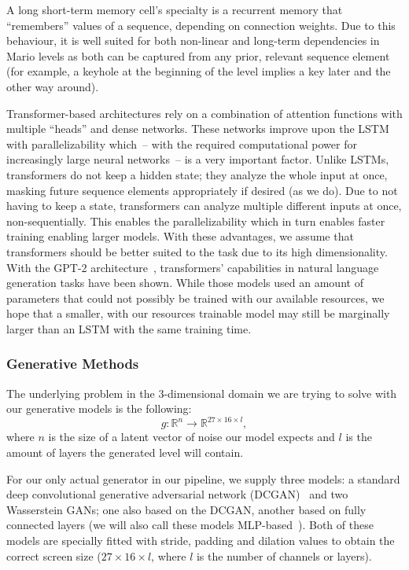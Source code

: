A long short-term memory cell's specialty is a recurrent memory that
``remembers'' values of a sequence, depending on connection weights.
Due to this behaviour, it is well suited for both non-linear and
long-term dependencies in Mario levels as both can be captured from
any prior, relevant sequence element (for example, a keyhole at the
beginning of the level implies a key later and the other way around).

Transformer-based architectures rely on a combination of attention
functions with multiple ``heads'' and dense networks. These networks
improve upon the LSTM with parallelizability which~-- with the required
computational power for increasingly large neural networks~-- is a very
important factor. Unlike LSTMs, transformers do not keep a hidden
state; they analyze the whole input at once, masking future sequence
elements appropriately if desired (as we do). Due to not having to
keep a state, transformers can analyze multiple different inputs at
once, non-sequentially. This enables the parallelizability which in
turn enables faster training enabling larger models. With these
advantages, we assume that transformers should be better suited to the
task due to its high dimensionality. With the GPT-2
architecture~\cite{radfordLanguageModelsAre}, transformers'
capabilities in natural language generation tasks have been shown.
While those models used an amount of parameters that could not
possibly be trained with our available resources, we hope that a
smaller, with our resources trainable model may still be marginally
larger than an LSTM with the same training time.

\subsubsection{Generative Methods}

The underlying problem in the 3-dimensional domain we are trying to
solve with our generative models is the following:
\begin{equation*}
  g: \mathbb{R}^{n} \to \mathbb{R}^{27 \times 16 \times l},
\end{equation*}
where $n$ is the size of a latent vector of noise our model expects
and $l$ is the amount of layers the generated level will contain.

For our only actual generator in our pipeline, we supply three models:
a standard deep convolutional generative adversarial network
(DCGAN)~\cite{radfordUnsupervisedRepresentationLearning2016} and two
Wasserstein GANs; one also based on the DCGAN, another based on fully
connected layers (we will also call these models
MLP-based~\cite{MultilayerPerceptron2019}). Both of these models are
specially fitted with stride, padding and dilation values to obtain
the correct screen size ($27 \times 16 \times l$, where $l$ is the number of
channels or layers).

